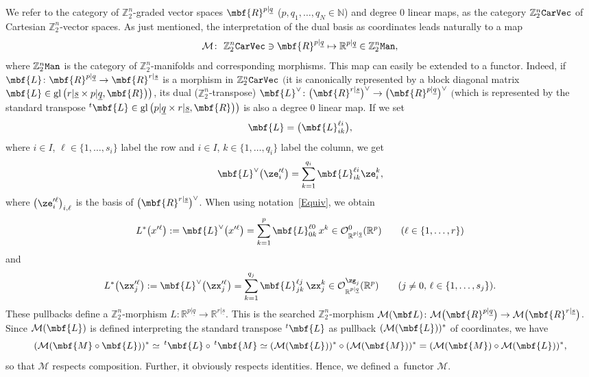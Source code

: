 \documentclass[10pt,a4paper]{amsart}
\newcommand{\op}[1]{\operatorname{#1}}
\newcommand{\R}{{\mathbb R}}
\newcommand{\Z}{{\mathbb Z}}
\def\ul{\underline}
\def\cM{\cal M}
\def\cO{\mathcal{O}}
\def\cM{\mathcal{M}}
\def\ul{\underline}
\newcommand{\0}{\otimes}
\numberwithin{equation}{section}
\providecommand{\cal}{\mathcal}
\begin{document}
We refer to the category of $\Z_2^n$-graded vector spaces $\mbf{R}^{p|\ul q}$ ($p, q_1,\dots,q_N\in\mathbb N$) and degree 0 linear maps, as the category $\Z_2^n\tt CarVec$ of Cartesian $\Z_2^n$-vector spaces. As just mentioned, the interpretation of the dual basis as coordinates leads naturally to a map
\[
\mathcal{M}\colon\ \Z_2^n{\tt CarVec}\ni\mbf{R}^{p|\ul q}\mapsto \R^{p|\ul q}\in\Z_2^n\tt Man,
\]
where $\Z_2^n\tt Man$ is the category of $\Z_2^n$-manifolds and corresponding morphisms. This map can easily be extended to a functor. Indeed, if $\mbf{L}\colon \mbf{R}^{p|\ul q}\to \mbf{R}^{r|\ul s}$ is a morphism in $\Z_2^n\tt CarVec$ $\big($it is canonically represented by a block diagonal matrix $\mbf{L}\in\op{gl}\big(r|\ul{s}\times p|\ul{q},\mbf{R}\big)\big)$, its dual ($\Z_2^n$-transpose) $\mbf{L}^\vee\colon \big(\mbf{R}^{r|\ul s}\big)^\vee\to \big(\mbf{R}^{p|\ul q}\big)^\vee$ $\big($which is represented by the standard transpose $^t\mbf{L}\in\op{gl}\big(p|\ul{q}\times r|\ul{s},\mbf{R}\big)\big)$ is also a degree 0 linear map. If we set
\[
\mbf{L}=\big(\mbf{L}^{\ell i}_{i k}\big),
\]
where $i\in I$, $\ell\in\{1,\dots, s_i\}$ label the row and $i\in I$, $k\in\{1,\dots,q_i\}$ label the column, we get
\[
\mbf{L}^\vee\big(\ze'^\ell_i\big)=\sum_{k=1}^{q_i} \mbf{L}^{\ell i}_{i k}\ze^k_i,
\]
where $\big(\ze'^\ell_i\big)_{i,\ell}$ is the basis of $\big(\mbf{R}^{r|\ul s}\big)^\vee$. When using notation~\eqref{Equiv}, we obtain
\begin{gather}\label{Pull1}
L^*\big(x'^\ell\big):=\mbf{L}^\vee\big(x'^\ell\big)=\sum_{k=1}^{p} \mbf{L}^{\ell 0}_{0 k}\,x^k\in \cO_{\R^{p|\ul q}}^{0}(\R^p)\qquad(\ell\in\{1,\dots, r\})
\end{gather}
and
\begin{gather}\label{Pull2}
L^*\big(\zx'^{\ell}_j\big):=\mbf{L}^\vee\big(\zx'^\ell_j\big)=\sum_{k=1}^{q_j} \mbf{L}^{\ell j}_{j k}\,\zx^k_j\in\cO_{\R^{p|\ul q}}^{\zg_j}(\R^p)\qquad(j\neq 0,\,\ell\in\{1,\dots,s_j\}).
\end{gather}
These pullbacks define a $\Z_2^n$-morphism $L\colon \R^{p|\ul q}\to \R^{r|\ul s}$. This is the searched $\Z_2^n$-morphism $\cM(\mbf L)\colon \cM\big(\mbf{R}^{p|\ul q}\big)\to \cM\big(\mbf{R}^{r|\ul s}\big)$. Since $\cM(\mbf{L})$ is defined interpreting the standard transpose $^t\mbf{L}$ as pullback $(\cM(\mbf{L}))^*$ of coordinates, we have \[
(\cM(\mbf{M}\circ\mbf{L}))^*\simeq\, ^t\mbf{L}\circ\,^t\mbf{M}\simeq(\cM(\mbf{L}))^*\circ(\cM(\mbf{M}))^*=(\cM(\mbf{M})\circ\cM(\mbf{L}))^*,
\]
so that $\cM$ respects composition. Further, it obviously respects identities. Hence, we defined a~functor $\cM$.
\end{document}
